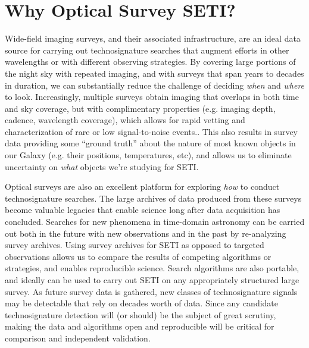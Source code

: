 \documentclass[twocolumn]{aastex62}
\begin{document}
\section{Why Optical Survey SETI?}
\label{sec:method}

Wide-field imaging surveys, and their associated infrastructure, are an ideal data source for carrying out technosignature searches that augment efforts in other wavelengths or with different observing strategies. By covering large portions of the night sky with repeated imaging, and with surveys that span years to decades in duration, we can substantially reduce the challenge of deciding {\it when} and {\it where} to look. Increasingly, multiple surveys obtain imaging that overlaps in both time and sky coverage, but with complimentary properties (e.g. imaging depth, cadence, wavelength coverage), which allows for rapid vetting and characterization of rare or low signal-to-noise events.. This also results in survey data providing some ``ground truth'' about the nature of most known objects in our Galaxy (e.g. their positions, temperatures, etc), and allows us to eliminate uncertainty on {\it what} objects we're studying for SETI.

Optical surveys are also an excellent platform for exploring {\it how} to conduct technosignature searches. The large archives of data produced from these surveys become valuable legacies that enable science long after data acquisition has concluded. Searches for new phenomena in time-domain astronomy can be carried out both in the future with new observations and in the past by re-analyzing survey archives. 
Using survey archives for SETI as opposed to targeted observations allows us to compare the results of competing algorithms or strategies, and enables reproducible science. Search algorithms are also portable, and ideally can be used to carry out SETI on any appropriately structured large survey.
As future survey data is gathered, new classes of technosignature signals may be detectable that rely on decades worth of data. 
Since any candidate technosignature detection will (or should) be the subject of great scrutiny, making the data and algorithms open and reproducible will be critical for comparison and independent validation. 
\end{document}
